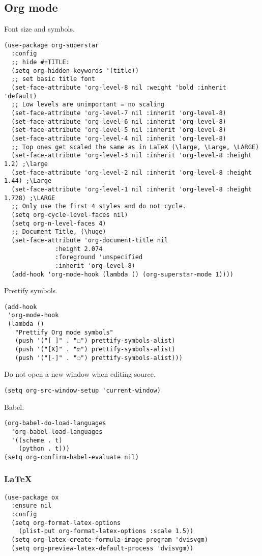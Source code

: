 \documentclass[11pt]{article}
\begin{document}
\subsection{Org mode}
\label{sec:org8efd88e}
Font size and symbols.
\begin{verbatim}
(use-package org-superstar
  :config
  ;; hide #+TITLE:
  (setq org-hidden-keywords '(title))
  ;; set basic title font
  (set-face-attribute 'org-level-8 nil :weight 'bold :inherit 'default)
  ;; Low levels are unimportant = no scaling
  (set-face-attribute 'org-level-7 nil :inherit 'org-level-8)
  (set-face-attribute 'org-level-6 nil :inherit 'org-level-8)
  (set-face-attribute 'org-level-5 nil :inherit 'org-level-8)
  (set-face-attribute 'org-level-4 nil :inherit 'org-level-8)
  ;; Top ones get scaled the same as in LaTeX (\large, \Large, \LARGE)
  (set-face-attribute 'org-level-3 nil :inherit 'org-level-8 :height 1.2) ;\large
  (set-face-attribute 'org-level-2 nil :inherit 'org-level-8 :height 1.44) ;\Large
  (set-face-attribute 'org-level-1 nil :inherit 'org-level-8 :height 1.728) ;\LARGE
  ;; Only use the first 4 styles and do not cycle.
  (setq org-cycle-level-faces nil)
  (setq org-n-level-faces 4)
  ;; Document Title, (\huge)
  (set-face-attribute 'org-document-title nil
		      :height 2.074
		      :foreground 'unspecified
		      :inherit 'org-level-8)
  (add-hook 'org-mode-hook (lambda () (org-superstar-mode 1))))
\end{verbatim}

Prettify symbols.
\begin{verbatim}
(add-hook
 'org-mode-hook
 (lambda ()
   "Prettify Org mode symbols"
   (push '("[ ]" . "☐") prettify-symbols-alist)
   (push '("[X]" . "☑") prettify-symbols-alist)
   (push '("[-]" . "❍") prettify-symbols-alist)))
\end{verbatim}

Do not open a new window when editing source.
\begin{verbatim}
(setq org-src-window-setup 'current-window)
\end{verbatim}

Babel.
\begin{verbatim}
(org-babel-do-load-languages
  'org-babel-load-languages
  '((scheme . t)
    (python . t)))
(setq org-confirm-babel-evaluate nil)
\end{verbatim}

\subsubsection{\LaTeX{}}
\label{sec:org388cd9a}
\begin{verbatim}
(use-package ox
  :ensure nil
  :config
  (setq org-format-latex-options
	(plist-put org-format-latex-options :scale 1.5))
  (setq org-latex-create-formula-image-program 'dvisvgm)
  (setq org-preview-latex-default-process 'dvisvgm))
\end{verbatim}
\end{document}
